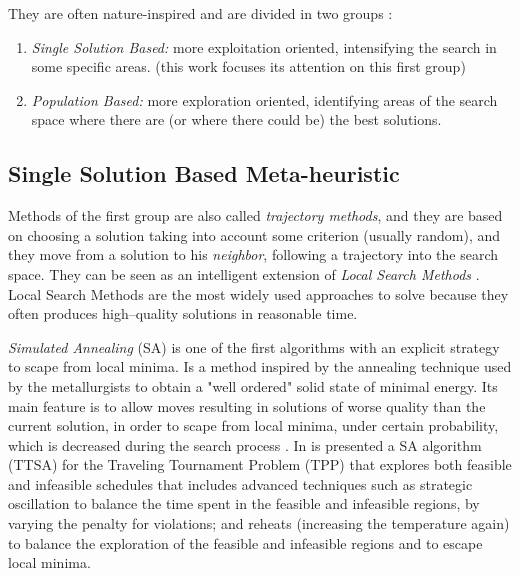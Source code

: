 They are often nature-inspired and are divided in two groups \cite{Boussaid2013}: 
\begin{enumerate}%
    \item {\it Single Solution Based:} more exploitation oriented, intensifying the search in some specific areas. (this work focuses its attention on this first group)
    \item {\it Population Based:} more exploration oriented, identifying areas of the search space where there are (or where there could be) the best solutions. %
\end{enumerate} %

\subsection{Single Solution Based Meta-heuristic}

Methods of the first group are also called {\it trajectory methods}, and they are based on choosing a solution taking into account some criterion (usually random), and they move from a solution to his \textit{neighbor}, following a trajectory into the search space. They can be seen as an intelligent extension of \textit{Local Search Methods} \cite{Boussaid2013}. Local Search Methods are the most widely used approaches to solve \COPs{} because they often produces high--quality solutions in reasonable time.
  
{\it Simulated Annealing} (SA) \cite{Nikolaev2010} is one of the first algorithms with an explicit strategy to scape from local minima. Is a method inspired by the annealing technique used by the metallurgists to obtain a "well ordered" solid state of minimal energy. Its main feature is to allow moves resulting in solutions of worse quality than the current solution, in order to scape from local minima, under certain probability, which is decreased during the search process \cite{Blum2003}. In \cite{Anagnostopoulos2006} is presented a SA algorithm (TTSA) for the Traveling Tournament Problem (TPP) that explores both feasible and infeasible schedules that includes advanced techniques such as strategic oscillation to balance the time spent in the feasible and infeasible regions, by varying the penalty for violations; and reheats (increasing the temperature again) to balance the exploration of the feasible and infeasible regions and to escape local minima.

